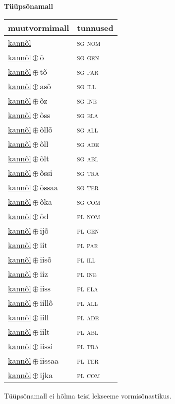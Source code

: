

\vspace{3.5em}
\noindent \begin{minipage}{\textwidth}
\noindent \textbf{Tüüpsõnamall \,}\\

\begin{sideways}
\begin{tabular}{l l}
muutvormimall & tunnused \\
\hline
\underline{kannõl} & \textsc{ sg nom } \\
\underline{kannõl}\,$\oplus$\,õ & \textsc{ sg gen } \\
\underline{kannõl}\,$\oplus$\,tõ & \textsc{ sg par } \\
\underline{kannõl}\,$\oplus$\,asõ & \textsc{ sg ill } \\
\underline{kannõl}\,$\oplus$\,õz & \textsc{ sg ine } \\
\underline{kannõl}\,$\oplus$\,õss & \textsc{ sg ela } \\
\underline{kannõl}\,$\oplus$\,õllõ & \textsc{ sg all } \\
\underline{kannõl}\,$\oplus$\,õll & \textsc{ sg ade } \\
\underline{kannõl}\,$\oplus$\,õlt & \textsc{ sg abl } \\
\underline{kannõl}\,$\oplus$\,õssi & \textsc{ sg tra } \\
\underline{kannõl}\,$\oplus$\,õssaa & \textsc{ sg ter } \\
\underline{kannõl}\,$\oplus$\,õka & \textsc{ sg com } \\
\underline{kannõl}\,$\oplus$\,õd & \textsc{ pl nom } \\
\underline{kannõl}\,$\oplus$\,ijõ & \textsc{ pl gen } \\
\underline{kannõl}\,$\oplus$\,iit & \textsc{ pl par } \\
\underline{kannõl}\,$\oplus$\,iisõ & \textsc{ pl ill } \\
\underline{kannõl}\,$\oplus$\,iiz & \textsc{ pl ine } \\
\underline{kannõl}\,$\oplus$\,iiss & \textsc{ pl ela } \\
\underline{kannõl}\,$\oplus$\,iillõ & \textsc{ pl all } \\
\underline{kannõl}\,$\oplus$\,iill & \textsc{ pl ade } \\
\underline{kannõl}\,$\oplus$\,iilt & \textsc{ pl abl } \\
\underline{kannõl}\,$\oplus$\,iissi & \textsc{ pl tra } \\
\underline{kannõl}\,$\oplus$\,iissaa & \textsc{ pl ter } \\
\underline{kannõl}\,$\oplus$\,ijka & \textsc{ pl com } \\
\end{tabular}
\end{sideways}
\label{tab:tüüpsõnamall-kannõl}

\end{minipage}

 
\vspace{1em}
\noindent Tüüpsõnamall  ei hõlma teisi lekseeme vormi\-sõnastikus.
